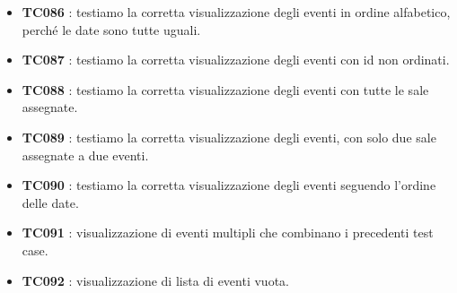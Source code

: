 \documentclass[11pt]{scrartcl} %
\begin{document}
\begin{itemize}


	\item \textbf{TC086} : testiamo la corretta visualizzazione degli eventi in ordine alfabetico, perché le date sono tutte uguali.

	\item \textbf{TC087} : testiamo la corretta visualizzazione degli eventi con id non ordinati.

	\item \textbf{TC088} : testiamo la corretta visualizzazione degli eventi con tutte le sale assegnate.

	\item \textbf{TC089} : testiamo la corretta visualizzazione degli eventi, con solo due sale assegnate a due eventi.

	\item \textbf{TC090} : testiamo la corretta visualizzazione degli eventi seguendo l'ordine delle date.

	\item \textbf{TC091} : visualizzazione di eventi multipli che combinano i precedenti test case.

	\item \textbf{TC092} : visualizzazione di lista di eventi vuota.
\end{itemize}

\end{document}
